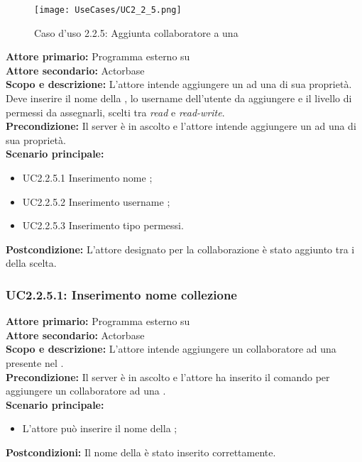 \documentclass{scalatekids-article}
\begin{document}
\begin{figure}[H]
  \begin{center}
    \texttt{[image: UseCases/UC2\_2\_5.png]}
    \caption{Caso d'uso 2.2.5: Aggiunta collaboratore a una }
  \end{center}
\end{figure}
\textbf{Attore primario:} Programma esterno su \\
\textbf{Attore secondario:} Actorbase\\
\textbf{Scopo e descrizione:} L'attore intende aggiungere un  ad una  di sua proprietà. Deve inserire il nome della , lo username dell'utente da aggiungere e il livello di permessi da assegnarli, scelti tra \textit{read} e \textit{read-write}.\\
\textbf{Precondizione:} Il server è in ascolto e l'attore intende aggiungere un  ad una  di sua proprietà.\\
\textbf{Scenario principale:}
\begin{itemize}
\item UC2.2.5.1 Inserimento nome ;
\item UC2.2.5.2 Inserimento username ;
\item UC2.2.5.3 Inserimento tipo permessi.
\end{itemize}
\textbf{Postcondizione:} L'attore designato per la collaborazione è stato aggiunto tra i  della  scelta.

\subsubsection{UC2.2.5.1: Inserimento nome collezione}

\textbf{Attore primario:} Programma esterno su \\
\textbf{Attore secondario:} Actorbase\\
\textbf{Scopo e descrizione:} L’attore intende aggiungere un collaboratore ad una  presente nel .\\
\textbf{Precondizione:} Il server è in ascolto e l’attore ha inserito il comando per aggiungere un collaboratore ad una .\\
\textbf{Scenario principale:}
\begin{itemize}
\item L'attore può inserire il nome della ;
\end{itemize}
\textbf{Postcondizioni:} Il nome della  è stato inserito correttamente.
\end{document}
